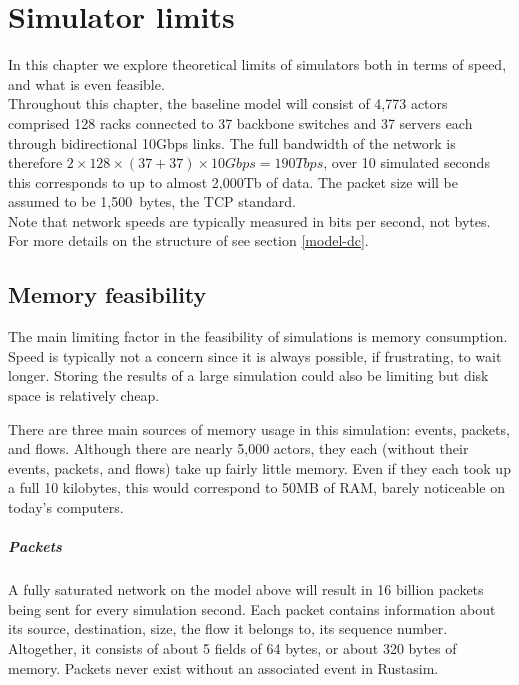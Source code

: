 \chapter{Simulator limits} \label{limits}

In this chapter we explore theoretical limits of simulators both in terms of speed, and what is even feasible.
\\

Throughout this chapter, the baseline model will consist of 4,773 actors comprised 128 racks connected to 37 backbone switches and 37 servers each through bidirectional 10Gbps links.
The full bandwidth of the network is therefore $2\times128\times(37+37)\times10Gbps = 190Tbps$, over 10 simulated seconds this corresponds to up to almost 2,000Tb of data.
The packet size will be assumed to be 1,500~bytes, the TCP standard. \\
Note that network speeds are typically measured in bits per second, not bytes.
For more details on the structure of \datacenters see section \ref{model-dc}.

\section{Memory feasibility} \label{limits-mem}

The main limiting factor in the feasibility of simulations is memory consumption.
Speed is typically not a concern since it is always possible, if frustrating, to wait longer.
Storing the results of a large simulation could also be limiting but disk space is relatively cheap.

There are three main sources of memory usage in this simulation: events, packets, and flows.
Although there are nearly 5,000 actors, they each (without their events, packets, and flows) take up fairly little memory.
Even if they each took up a full 10 kilobytes, this would correspond to 50MB of RAM, barely noticeable on today's computers.

\paragraph{Packets}
A fully saturated network on the model above will result in 16 billion packets being sent for every simulation second.
Each packet contains information about its source, destination, size, the flow it belongs to, its sequence number.
Altogether, it consists of about 5 fields of 64 bytes, or about 320 bytes of memory.
Packets never exist without an associated event in Rustasim.


